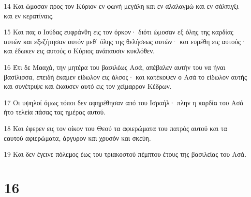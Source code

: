 \par 14 Και ώμοσαν προς τον Κύριον εν φωνή μεγάλη και εν αλαλαγμώ και εν σάλπιγξι και εν κερατίναις.
\par 15 Και πας ο Ιούδας ευφράνθη εις τον όρκον· διότι ώμοσαν εξ όλης της καρδίας αυτών και εξεζήτησαν αυτόν μεθ' όλης της θελήσεως αυτών· και ευρέθη εις αυτούς· και έδωκεν εις αυτούς ο Κύριος ανάπαυσιν κυκλόθεν.
\par 16 Έτι δε Μααχά, την μητέρα του βασιλέως Ασά, απέβαλεν αυτήν του να ήναι βασίλισσα, επειδή έκαμεν είδωλον εις άλσος· και κατέκοψεν ο Ασά το είδωλον αυτής και συνέτριψε και έκαυσεν αυτό εις τον χείμαρρον Κέδρων.
\par 17 Οι υψηλοί όμως τόποι δεν αφηρέθησαν από του Ισραήλ· πλην η καρδία του Ασά ήτο τελεία πάσας τας ημέρας αυτού.
\par 18 Και έφερεν εις τον οίκον του Θεού τα αφιερώματα του πατρός αυτού και τα εαυτού αφιερώματα, άργυρον και χρυσόν και σκεύη.
\par 19 Και δεν έγεινε πόλεμος έως του τριακοστού πέμπτου έτους της βασιλείας του Ασά.

\chapter{16}

